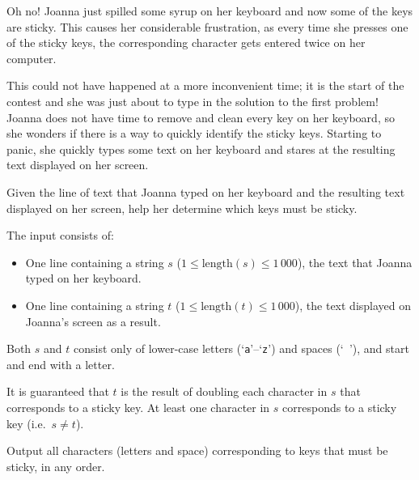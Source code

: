 %
Oh no! Joanna just spilled some syrup on her keyboard and now some of the keys
are sticky. This causes her considerable frustration, as every time she presses
one of the sticky keys, the corresponding character gets entered twice on her
computer.

This could not have happened at a more inconvenient time; it is the start of
the contest and she was just about to type in the solution to the first
problem! Joanna does not have time to remove and clean every key on her
keyboard, so she wonders if there is a way to quickly identify the sticky keys.
Starting to panic, she quickly types some text on her keyboard and stares at
the resulting text displayed on her screen.

Given the line of text that Joanna typed on her keyboard and the resulting text
displayed on her screen, help her determine which keys must be sticky.

\begin{Input}
The input consists of:
\begin{itemize}
    \item One line containing a string $s$ ($1 \leq \mathrm{length}(s) \leq 1\,000$), the text that Joanna typed on her keyboard.
    \item One line containing a string $t$ ($1 \leq \mathrm{length}(t) \leq 1\,000$), the text displayed on Joanna's screen as a result.
\end{itemize}

Both $s$ and $t$ consist only of lower-case letters (`\texttt{a}'--`\texttt{z}') and
spaces (`\texttt{ }'), and start and end with a letter.

It is guaranteed that $t$ is the result of doubling each
character in $s$ that corresponds to a sticky key. At least one character in
$s$ corresponds to a sticky key (i.e.\ $s \neq t$).
\end{Input}

\begin{Output}
Output all characters (letters and space) corresponding to keys that must be
sticky, in any order.
\end{Output}
